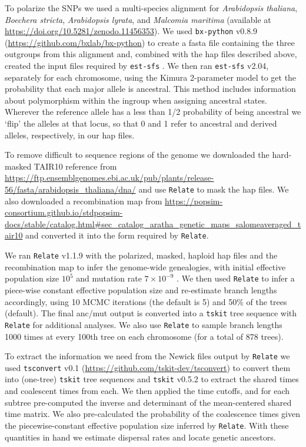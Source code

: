 \documentclass[12pt]{article}
\begin{document}
To polarize the SNPs we used a multi-species alignment for \textit{Arabidopsis thaliana}, \textit{Boechera stricta}, \textit{Arabidopsis lyrata}, and \textit{Malcomia maritima} (available at \url{https://doi.org/10.5281/zenodo.11456353}).
We used \texttt{bx-python} v0.8.9 (\url{https://github.com/bxlab/bx-python}) to create a fasta file containing the three outgroups from this alignment and, combined with the hap files described above, created the input files required by \texttt{est-sfs} \citep{keightley2018inferring}.
We then ran \texttt{est-sfs} v2.04, separately for each chromosome, using the Kimura 2-parameter model \citep{kimura1980simple} to get the probability that each major allele is ancestral.
This method includes information about polymorphism within the ingroup when assigning ancestral states.
Wherever the reference allele has a less than 1/2 probability of being ancestral we `flip' the alleles at that locus, so that 0 and 1 refer to ancestral and derived alleles, respectively, in our hap files.

To remove difficult to sequence regions of the genome we downloaded the hard-masked TAIR10 reference from \url{https://ftp.ensemblgenomes.ebi.ac.uk/pub/plants/release-56/fasta/arabidopsis_thaliana/dna/} and use \texttt{Relate} to mask the hap files.
We also downloaded a recombination map from \url{https://popsim-consortium.github.io/stdpopsim-docs/stable/catalog.html#sec_catalog_aratha_genetic_maps_salomeaveraged_tair10} \citep{10.7554/eLife.54967,salome2012recombination} and converted it into the form required by \texttt{Relate}.

We ran \texttt{Relate} v1.1.9 with the polarized, masked, haploid hap files and the recombination map to infer the genome-wide genealogies, with initial effective population size $10^5$ and mutation rate $7\times10^{-9}$ \citep{10.7554/eLife.54967}.
We then used \texttt{Relate} to infer a piece-wise constant effective population size and re-estimate branch lengths accordingly, using 10 MCMC iterations (the default is 5) and 50\% of the trees (default).
The final anc/mut output is converted into a \texttt{tskit} tree sequence with \texttt{Relate} for additional analyses.
We also use \texttt{Relate} to sample branch lengths 1000 times at every 100th tree on each chromosome (for a total of 878 trees).

To extract the information we need from the Newick files output by \texttt{Relate} we used \texttt{tsconvert} v0.1 (\url{https://github.com/tskit-dev/tsconvert}) to convert them into (one-tree) \texttt{tskit} tree sequences and \texttt{tskit} v0.5.2 to extract the shared times and coalescent times from each.
We then applied the time cutoffs, and for each subtree pre-computed the inverse and determinant of the mean-centered shared time matrix.
We also pre-calculated the probability of the coalescence times given the piecewise-constant effective population size inferred by \texttt{Relate}.
With these quantities in hand we estimate dispersal rates and locate genetic ancestors.
\end{document}
